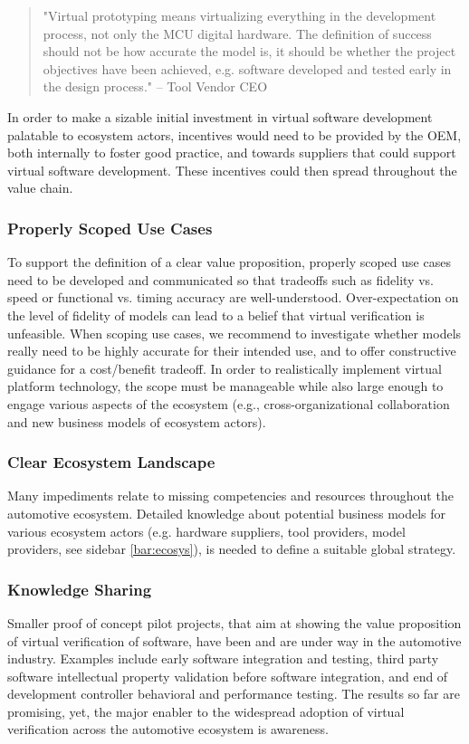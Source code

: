 \begin{quote}
"Virtual prototyping means virtualizing everything in the development process, not only the MCU digital hardware.
The definition of success should not be how accurate the model is,
it should be whether the project objectives have been achieved, e.g. software developed and tested early in the design process."
-- Tool Vendor CEO
\end{quote}

In order to make a sizable initial investment in virtual software development palatable to ecosystem actors,
incentives would need to be provided by the OEM,
both internally to foster good practice, and towards suppliers that could support virtual software development.
These incentives could then spread throughout the value chain.

\subsubsection*{Properly Scoped Use Cases}
To support the definition of a clear value proposition,
properly scoped use cases need to be {developed and} communicated so that tradeoffs such as fidelity vs. speed or functional vs. timing accuracy are well-understood.
Over-expectation on the level of fidelity of models %
can lead to a belief that virtual verification is unfeasible.
When scoping use cases, we recommend to  
investigate whether models really need to be highly accurate for their intended use, and to offer constructive guidance for a cost/benefit tradeoff.
In order to realistically implement virtual platform technology,
the scope must be manageable while also large enough to engage various aspects of the ecosystem
(e.g., cross-organizational collaboration and new business models of ecosystem actors).

\subsubsection*{Clear Ecosystem Landscape}
Many impediments relate to missing competencies and resources throughout the automotive ecosystem. 
Detailed knowledge about potential business models for various ecosystem actors (e.g. hardware suppliers, tool providers, model providers, see sidebar \ref{bar:ecosys}), is needed to define a suitable global strategy. 

\subsubsection*{Knowledge Sharing}
Smaller proof of concept pilot projects, that aim at showing the value proposition of virtual verification of software, have been and are under way in the automotive industry.
Examples include early software integration and testing, third party software intellectual property validation before software integration, and end of development controller behavioral and performance testing.
The results so far are promising, yet, the major enabler to the widespread adoption of virtual verification across the automotive ecosystem is awareness.

